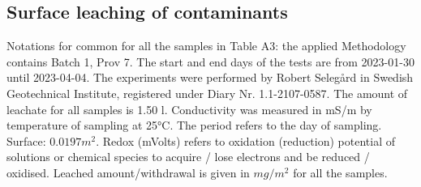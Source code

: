 \documentclass[algorithms,article,submit,pdftex,moreauthors]{Definitions/mdpi}
\begin{document}
\subsection[\appendixname~\thesubsection]{Surface leaching of contaminants}

Notations for common for all the samples in Table A3: the applied Methodology contains Batch 1, Prov 7. The start and end days of the tests are from 2023-01-30 until 2023-04-04. The experiments were performed by Robert Selegård in Swedish Geotechnical Institute, registered under Diary Nr. 1.1-2107-0587. The amount of leachate for all samples is 1.50 l. Conductivity was measured in mS/m by temperature of sampling at 25°C. The period refers to the day of sampling. Surface: $0.0197 m^2$. Redox (mVolts) refers to oxidation (reduction) potential of solutions or chemical species to acquire / lose electrons and be reduced / oxidised. Leached amount/withdrawal is given in $mg/m^2$ for all the samples. 
\end{document}
